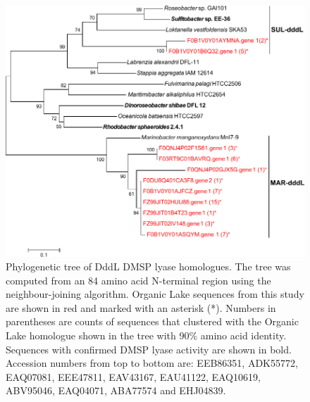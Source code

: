 \begin{figure}
\includegraphics{orglake_figures/dddL_tree.pdf}
\caption[Phylogenetic tree of DddL DMSP lyase homologues]{Phylogenetic tree of DddL DMSP lyase homologues. The tree was computed from an 84 amino acid N-terminal region using the neighbour-joining algorithm. Organic Lake sequences from this study are shown in red and marked with an asterisk (*). Numbers in parentheses are counts of sequences that clustered with the Organic Lake homologue shown in the tree with 90\% amino acid identity. Sequences with confirmed DMSP lyase activity are shown in bold. Accession numbers from top to bottom are: EEB86351, ADK55772, EAQ07081, EEE47811, EAV43167, EAU41122, EAQ10619, ABV95046, EAQ04071, ABA77574 and EHJ04839.}
\label{fig:dddL_tree}

\end{figure}
